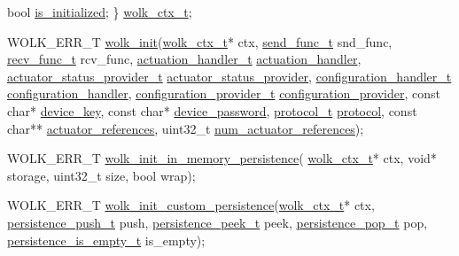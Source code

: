\begin{DoxyCodeInclude}
    \textcolor{keywordtype}{bool} \hyperlink{structwolk__ctx_ae0a13a533a7c9ffc516eda95cd6ed324}{is\_initialized};
\} \hyperlink{wolk__connector_8h_ac2ef8e5728bb7f6b92489fb48d3cf154}{wolk\_ctx\_t};

WOLK\_ERR\_T \hyperlink{wolk__connector_8h_a607b5439ae7741284a73312b7794fa7a}{wolk\_init}(\hyperlink{structwolk__ctx}{wolk\_ctx\_t}* ctx, \hyperlink{wolk__connector_8h_a830662686699e21c1280f63d2ec80faf}{send\_func\_t} snd\_func, 
      \hyperlink{wolk__connector_8h_ac6f167182b7b63052d13946a6c4fba06}{recv\_func\_t} rcv\_func, \hyperlink{wolk__connector_8h_acde87869e807b1774680f3f2b5b04e2f}{actuation\_handler\_t} 
      \hyperlink{structwolk__ctx_a2ab241133283e361c6822409f7ec48ca}{actuation\_handler},
                     \hyperlink{wolk__connector_8h_af3e8919a04a293972b64605557287537}{actuator\_status\_provider\_t} 
      \hyperlink{structwolk__ctx_aee7f3ef8dbcfd4f8a3817ef26a1629f6}{actuator\_status\_provider}, \hyperlink{wolk__connector_8h_a6662d0d41546795466cc2b398d8dcb08}{configuration\_handler\_t} 
      \hyperlink{structwolk__ctx_a6c0926345d1d56f8fbd3cb50d8f4a804}{configuration\_handler},
                     \hyperlink{wolk__connector_8h_a64d56254d09f9e452751f32b3c5a39d3}{configuration\_provider\_t} 
      \hyperlink{structwolk__ctx_a982fc36741a8c8cfb5ad3939363cebf8}{configuration\_provider}, \textcolor{keyword}{const} \textcolor{keywordtype}{char}* \hyperlink{structwolk__ctx_a4b67ae9b0271566e7dae56c03053906b}{device\_key},
                     \textcolor{keyword}{const} \textcolor{keywordtype}{char}* \hyperlink{structwolk__ctx_af6ea97768cfd0445f8b9535e0e2c354b}{device\_password}, \hyperlink{wolk__connector_8h_a91e19fa4fff461493e1a41f7c7aa4e5f}{protocol\_t} 
      \hyperlink{structwolk__ctx_af93f257ff60dd00f34455d425207e66f}{protocol}, \textcolor{keyword}{const} \textcolor{keywordtype}{char}** \hyperlink{structwolk__ctx_aa2127e8414d0d9c6214343891f4a322f}{actuator\_references},
                     uint32\_t \hyperlink{structwolk__ctx_a23e98a97649d679e4a85c87f2da1f8e5}{num\_actuator\_references});

WOLK\_ERR\_T \hyperlink{wolk__connector_8h_a0fbb983c6b65072501b078ba6ff8e5ad}{wolk\_init\_in\_memory\_persistence}(
      \hyperlink{structwolk__ctx}{wolk\_ctx\_t}* ctx, \textcolor{keywordtype}{void}* storage, uint32\_t size, \textcolor{keywordtype}{bool} wrap);

WOLK\_ERR\_T \hyperlink{wolk__connector_8h_a4cb5cc0164b0ab19f9b2bf36d28e9913}{wolk\_init\_custom\_persistence}(\hyperlink{structwolk__ctx}{wolk\_ctx\_t}* ctx, 
      \hyperlink{persistence_8h_a7543ef4dbe6bd99c90951a9283d53c96}{persistence\_push\_t} push, \hyperlink{persistence_8h_a72b6e8035474c47c1fe02bd032015c57}{persistence\_peek\_t} peek,
                                        \hyperlink{persistence_8h_a7a0e08be12607e823180cdc34226f399}{persistence\_pop\_t} pop, 
      \hyperlink{persistence_8h_a1c7eb950f361106f1a9d1e802d2da115}{persistence\_is\_empty\_t} is\_empty);


\end{DoxyCodeInclude}
